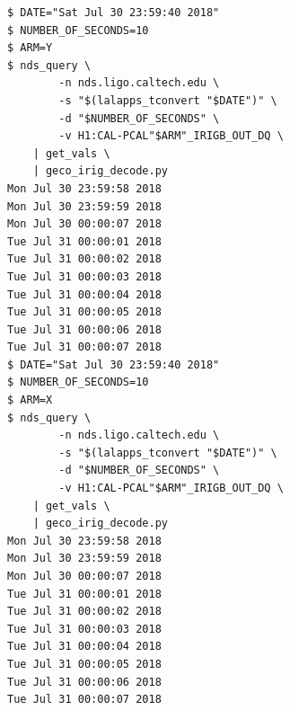 \documentclass{article}
\begin{document}
\begin{lstlisting}
$ DATE="Sat Jul 30 23:59:40 2018"
$ NUMBER_OF_SECONDS=10
$ ARM=Y
$ nds_query \
        -n nds.ligo.caltech.edu \
        -s "$(lalapps_tconvert "$DATE")" \
        -d "$NUMBER_OF_SECONDS" \
        -v H1:CAL-PCAL"$ARM"_IRIGB_OUT_DQ \
    | get_vals \
    | geco_irig_decode.py
Mon Jul 30 23:59:58 2018
Mon Jul 30 23:59:59 2018
Mon Jul 30 00:00:07 2018
Tue Jul 31 00:00:01 2018
Tue Jul 31 00:00:02 2018
Tue Jul 31 00:00:03 2018
Tue Jul 31 00:00:04 2018
Tue Jul 31 00:00:05 2018
Tue Jul 31 00:00:06 2018
Tue Jul 31 00:00:07 2018
$ DATE="Sat Jul 30 23:59:40 2018"
$ NUMBER_OF_SECONDS=10
$ ARM=X
$ nds_query \
        -n nds.ligo.caltech.edu \
        -s "$(lalapps_tconvert "$DATE")" \
        -d "$NUMBER_OF_SECONDS" \
        -v H1:CAL-PCAL"$ARM"_IRIGB_OUT_DQ \
    | get_vals \
    | geco_irig_decode.py
Mon Jul 30 23:59:58 2018
Mon Jul 30 23:59:59 2018
Mon Jul 30 00:00:07 2018
Tue Jul 31 00:00:01 2018
Tue Jul 31 00:00:02 2018
Tue Jul 31 00:00:03 2018
Tue Jul 31 00:00:04 2018
Tue Jul 31 00:00:05 2018
Tue Jul 31 00:00:06 2018
Tue Jul 31 00:00:07 2018
\end{lstlisting}

\clearpage
\end{document}
